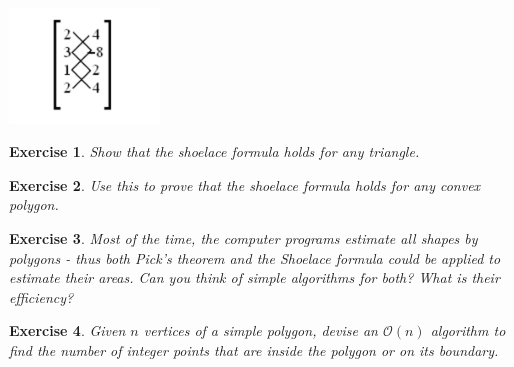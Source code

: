 \documentclass{article}
\newtheorem{exercise}{Exercise}
\begin{document}
\begin{center}
\includegraphics[width=4cm]{shoelace}
\end{center}

\begin{exercise}
    Show that the shoelace formula holds for any triangle.
\end{exercise}

\begin{exercise}
    Use this to prove that the shoelace formula holds for any convex polygon.
\end{exercise}

\begin{exercise}
Most of the time, the computer programs estimate all shapes by polygons - thus both Pick's theorem and the Shoelace formula could be applied to estimate their areas. Can you think of simple algorithms for both? What is their efficiency?
\end{exercise}

\begin{exercise}
Given $n$ vertices of a simple polygon, devise an $\mathcal{O}(n)$ algorithm to find the number of integer points that are inside the polygon or on its boundary.
\end{exercise}
\end{document}
